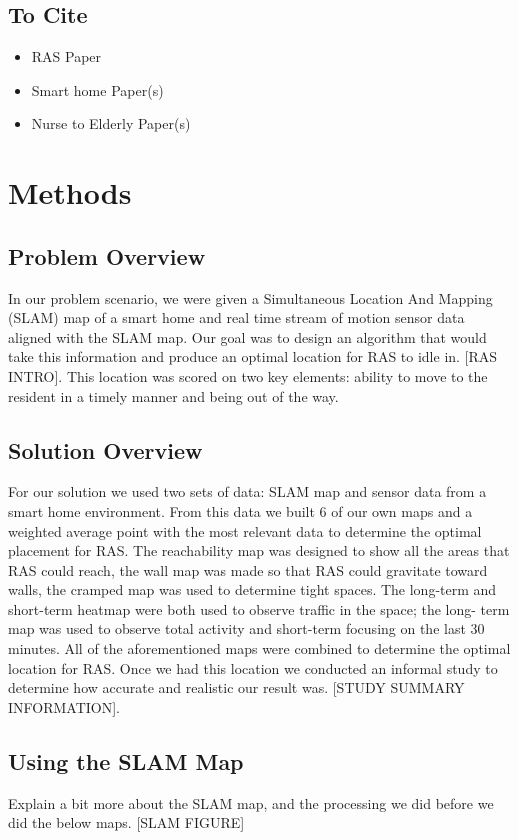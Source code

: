 \documentclass[11pt, draft, a4paper]{IEEEtran}
\begin{document}
\subsection{To Cite}
\begin{itemize}
    \item RAS Paper
    \item Smart home Paper(s)
    \item Nurse to Elderly Paper(s)
\end{itemize}


\section{Methods}


\subsection{Problem Overview}
In our problem scenario, we were given a Simultaneous Location And Mapping 
(SLAM) map of a smart home and real time stream of motion sensor data aligned 
with the SLAM map. Our goal was to design an algorithm that would  take this 
information and produce an optimal location for RAS to idle in. [RAS INTRO]. 
This location was scored on two key elements: ability to move to the resident 
in a timely manner and being out of the way. 


\subsection{Solution Overview}
For our solution we used two sets of data: SLAM map and sensor data from a 
smart home environment. From this data we built 6 of our own maps and a 
weighted average point with the most relevant data to determine the optimal 
placement for RAS. The reachability map was designed to show all the areas 
that RAS could reach, the wall map was made so that RAS could gravitate toward 
walls, the cramped map was used to determine tight spaces. The long-term and 
short-term heatmap were both used to observe traffic in the space; the long-
term map was used to observe total activity and short-term focusing on the 
last 30 minutes. All of the aforementioned maps were combined to determine the 
optimal location for RAS. Once we had this location we conducted an informal 
study to determine how accurate and realistic our result was. [STUDY SUMMARY 
INFORMATION].


\subsection{Using the SLAM Map}
Explain a bit more about the SLAM map, and the processing we did before we did 
the below maps.
[SLAM FIGURE]
\end{document}
